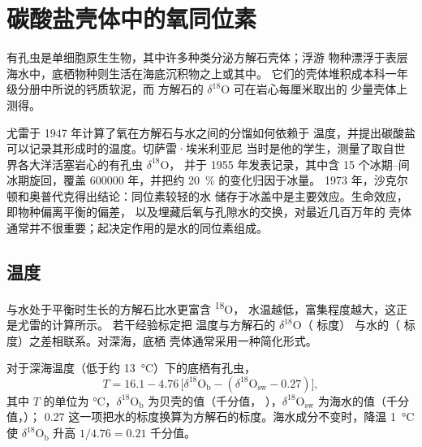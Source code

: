 \section{碳酸盐壳体中的氧同位素}\label{sec:b2:climate-proxies:oxygen}

有孔虫是单细胞原生生物，其中许多种类分泌方解石壳体；浮游
物种漂浮于表层海水中，底栖物种则生活在海底沉积物之上或其中。
它们的壳体堆积成本科一年级分册中所说的钙质软泥，而
方解石的 $\delta^{18}$O 可在岩心每厘米取出的
少量壳体上测得。

\begin{history}[同一记录的两种解读]
尤雷于 1947 年计算了氧在方解石与水之间的分馏如何依赖于
温度，并提出碳酸盐可以记录其形成时的温度。切萨雷·埃米利亚尼
当时是他的学生，测量了取自世界各大洋活塞岩心的有孔虫 $\delta^{18}$O，
并于 1955 年发表记录，其中含 15 个冰期–间冰期旋回，覆盖
\num{600000} 年，并把约 \qty{20}{\percent} 的变化归因于冰量。
1973 年，沙克尔顿和奥普代克得出结论：同位素较轻的水
储存于冰盖中是主要效应。生命效应，即物种偏离平衡的偏差，
以及埋藏后氧与孔隙水的交换，对最近几百万年的
壳体通常并不很重要；起决定作用的是水的同位素组成。
\end{history}

\subsection*{温度}

与水处于平衡时生长的方解石比水更富含 \textsuperscript{18}O，
水温越低，富集程度越大，这正是尤雷的计算所示。
若干经验标定把
温度与方解石的 $\delta^{18}$O（ 标度）
与水的（ 标度）之差相联系。对深海，底栖
壳体通常采用一种简化形式。

\begin{proposition}[底栖生物校准]\label{prop:b2:climate-proxies:benthic}
对于深海温度（低于约 \qty{13}{\celsius}）下的底栖有孔虫，
\[
  T = 16.1 - 4.76\,\bigl[\delta^{18}\mathrm{O}_{\mathrm{b}} - (\delta^{18}\mathrm{O}_{\mathrm{sw}} -
  0.27)\bigr],
\]
其中 $T$ 的单位为 \unit{\celsius}，$\delta^{18}\mathrm{O}_{\mathrm{b}}$ 为贝壳的值（千分值，
），$\delta^{18}\mathrm{O}_{\mathrm{sw}}$ 为海水的值（千分值，）；
0.27 这一项把水的标度换算为方解石的标度。海水成分不变时，降温 \qty{1}{\celsius}
使 $\delta^{18}\mathrm{O}_{\mathrm{b}}$ 升高 $1/4.76 = 0.21$ 千分值。
\end{proposition}
\admitted

